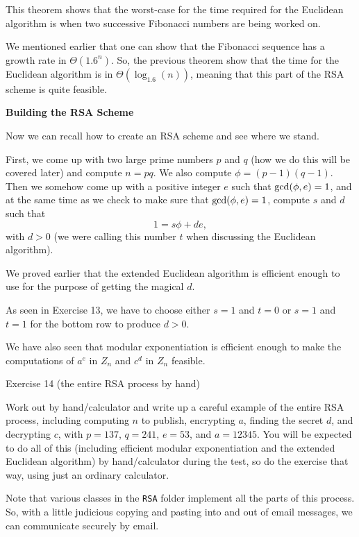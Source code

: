 This theorem shows that the worst-case for the time required for the
Euclidean algorithm is when two successive Fibonacci numbers are being worked on.
\medskip

We mentioned earlier that one can show that
the Fibonacci sequence has a growth rate in
 $\Theta(1.6^n)$.  
So, the previous theorem show that the  time for the Euclidean algorithm is in $\Theta\left( \log_{1.6} ( n ) \right)$, meaning that
this part of the RSA scheme is quite feasible.
\border

{\bf Building the RSA Scheme}
\medskip

Now we can recall how to create an RSA scheme and see where we stand.
\medskip

First, we come up with two large prime numbers $p$ and $q$  (how we do this
will be covered later) and compute $n=pq$.
We also compute $\phi = (p-1)(q-1)$.
Then we somehow come up with a positive integer $e$ such that $\hbox{gcd}(\phi,e) = 1$,
and at the same time as we check to make sure that $\hbox{gcd}(\phi,e)=1$,
compute $s$ and $d$ such that
$$
1 = s \phi + d e,
$$
with $d > 0$ (we were calling this number $t$ when discussing the Euclidean algorithm).
\medskip

We proved earlier that the extended Euclidean algorithm is efficient enough to use for
the purpose of getting the magical $d$.
\medskip

\In
As seen in Exercise 13,
we have to choose either $s=1$ and $t=0$ or $s=1$ and $t=1$ for the bottom row
to produce $d > 0$.
\medskip
\Out

We have also seen that modular exponentiation is efficient enough to make the
computations of $a^e$ in $Z_n$ and $c^d$ in $Z_n$ feasible.
\border

{\bigboldfont Exercise 14} (the entire RSA process by hand)
\medskip

Work out by hand/calculator and write up a careful example of the entire RSA process, including 
computing $n$ to publish, encrypting $a$, 
finding the secret $d$, and decrypting $c$,
with $p=137$, $q=241$, $e=53$, and $a = 12345$.
You will be expected to do all of this  (including efficient modular exponentiation and
the extended Euclidean algorithm) by hand/calculator during the test, so do the exercise that way,
using just an ordinary
calculator.
\border


Note that various classes in the {\tt RSA} folder implement all the parts of
this process.  So, with a little judicious copying and pasting into and out of
email messages, we can communicate securely by email.
\border
\Outdent


